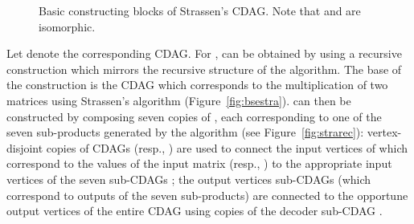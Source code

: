 \documentclass[a4paper,UKenglish]{lipics-v2016}
\begin{document}
\begin{figure}
\begin{subfigure}{.31\textwidth}
{
    }
  \caption{}
  \label{fig:dec}
\end{subfigure}
\caption[Basic constructing blocks of Strassen's algorithm CDAG]{Basic constructing blocks of Strassen's CDAG. Note that  and  are isomorphic.}
\label{fig:fig}
\end{figure}
Let  denote the corresponding CDAG. For ,  can be obtained by using a recursive construction which mirrors the recursive structure of the algorithm. The base of the construction is the  CDAG which corresponds to the multiplication of two  matrices using Strassen's algorithm (Figure~\ref{fig:bsestra}).  can then be constructed by composing seven copies of , each corresponding to one of the seven sub-products generated by the algorithm (see Figure~\ref{fig:strarec}):  
   vertex-disjoint copies of CDAGs  (resp., ) are used to connect the input vertices of  which correspond to the values of the input matrix  (resp., ) to the appropriate input vertices of the seven sub-CDAGs ; the output vertices sub-CDAGs  (which  correspond to outputs of the seven sub-products) are connected to the opportune output vertices of the entire  CDAG  using  copies of the decoder sub-CDAG .
  
\end{document}

